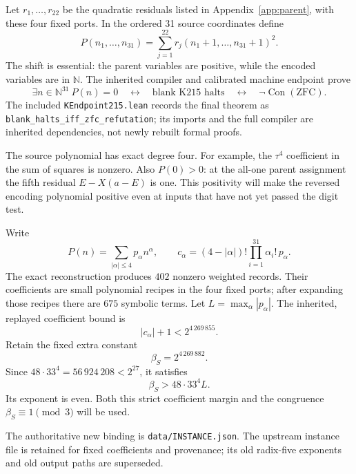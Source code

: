 \documentclass[11pt,letterpaper]{article}
\newcommand{\N}{\mathbb N}
\newcommand{\Con}{\operatorname{Con}}
\newcommand{\ZFC}{\mathrm{ZFC}}
\theoremstyle{remark}
\begin{document}
Let \(r_1,\ldots,r_{22}\) be the quadratic residuals listed in
Appendix~\ref{app:parent}, with these four fixed ports. In the ordered
31 source coordinates define
\begin{equation}
P(n_1,\ldots,n_{31})
   =\sum_{j=1}^{22}r_j(n_1+1,\ldots,n_{31}+1)^2.
\label{eq:parent}
\end{equation}
The shift is essential: the parent variables are positive, while the
encoded variables are in \(\N\). The inherited compiler and calibrated
machine endpoint prove
\begin{equation}
\exists n\in\N^{31}\ P(n)=0
\quad\longleftrightarrow\quad
\text{blank K215 halts}
\quad\longleftrightarrow\quad
\neg\Con(\ZFC).
\label{eq:inherited}
\end{equation}
The included \texttt{KEndpoint215.lean} records the final theorem as
\texttt{blank\_halts\_iff\_zfc\_refutation}; its imports and the full
compiler are inherited dependencies, not newly rebuilt formal proofs.

The source polynomial has exact degree four. For example, the
\(\tau^4\) coefficient in the sum of squares is nonzero. Also \(P(0)>0\):
at the all-one parent assignment the fifth residual \(E-X(a-E)\) is
one. This positivity will make the reversed encoding polynomial
positive even at inputs that have not yet passed the digit test.

Write
\[
P(n)=\sum_{|\alpha|\le4}p_\alpha n^\alpha,\qquad
c_\alpha=(4-|\alpha|)!\prod_{i=1}^{31}\alpha_i!\,p_\alpha.
\]
The exact reconstruction produces \(402\) nonzero weighted records.
Their coefficients are small polynomial recipes in the four fixed
ports; after expanding those recipes there are \(675\) symbolic terms.
Let \(L=\max_\alpha|p_\alpha|\). The inherited, replayed coefficient
bound is
\[
|c_\alpha|+1<2^{4\,269\,855}.
\]
Retain the fixed extra constant
\begin{equation}
\boxed{\beta_S=2^{4\,269\,882}}.
\label{eq:betas}
\end{equation}
Since \(48\cdot33^4=56\,924\,208<2^{27}\), it satisfies
\begin{equation}
\beta_S>48\cdot33^4L.
\label{eq:coefbound}
\end{equation}
Its exponent is even. Both this strict coefficient margin and the
congruence \(\beta_S\equiv1\pmod3\) will be used.

The authoritative new binding is \texttt{data/INSTANCE.json}. The
upstream instance file is retained for fixed coefficients and provenance;
its old radix-five exponents and old output paths are superseded.
\end{document}
